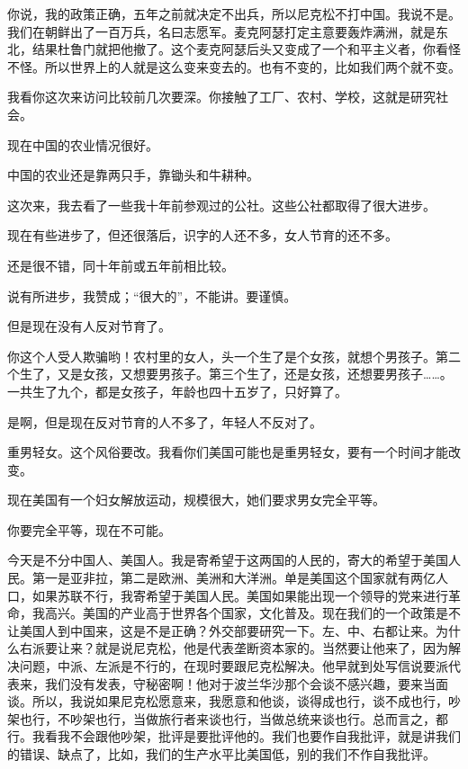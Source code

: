 你说，我的政策正确，五年之前就决定不出兵，所以尼克松不打中国。我说不是。我们在朝鲜出了一百万兵，名曰志愿军。麦克阿瑟打定主意要轰炸满洲，就是东北，结果杜鲁门就把他撤了。这个麦克阿瑟后头又变成了一个和平主义者，你看怪不怪。所以世界上的人就是这么变来变去的。也有不变的，比如我们两个就不变。

我看你这次来访问比较前几次要深。你接触了工厂、农村、学校，这就是研究社会。

现在中国的农业情况很好。

中国的农业还是靠两只手，靠锄头和牛耕种。

这次来，我去看了一些我十年前参观过的公社。这些公社都取得了很大进步。

现在有些进步了，但还很落后，识字的人还不多，女人节育的还不多。

还是很不错，同十年前或五年前相比较。

说有所进步，我赞成；“很大的”，不能讲。要谨慎。

但是现在没有人反对节育了。

你这个人受人欺骗哟！农村里的女人，头一个生了是个女孩，就想个男孩子。第二个生了，又是女孩，又想要男孩子。第三个生了，还是女孩，还想要男孩子……。一共生了九个，都是女孩子，年龄也四十五岁了，只好算了。

是啊，但是现在反对节育的人不多了，年轻人不反对了。

重男轻女。这个风俗要改。我看你们美国可能也是重男轻女，要有一个时间才能改变。

现在美国有一个妇女解放运动，规模很大，她们要求男女完全平等。

你要完全平等，现在不可能。

今天是不分中国人、美国人。我是寄希望于这两国的人民的，寄大的希望于美国人民。第一是亚非拉，第二是欧洲、美洲和大洋洲。单是美国这个国家就有两亿人口，如果苏联不行，我寄希望于美国人民。美国如果能出现一个领导的党来进行革命，我高兴。美国的产业高于世界各个国家，文化普及。现在我们的一个政策是不让美国人到中国来，这是不是正确？外交部要研究一下。左、中、右都让来。为什么右派要让来？就是说尼克松，他是代表垄断资本家的。当然要让他来了，因为解决问题，中派、左派是不行的，在现时要跟尼克松解决。他早就到处写信说要派代表来，我们没有发表，守秘密啊！他对于波兰华沙那个会谈不感兴趣，要来当面谈。所以，我说如果尼克松愿意来，我愿意和他谈，谈得成也行，谈不成也行，吵架也行，不吵架也行，当做旅行者来谈也行，当做总统来谈也行。总而言之，都行。我看我不会跟他吵架，批评是要批评他的。我们也要作自我批评，就是讲我们的错误、缺点了，比如，我们的生产水平比美国低，别的我们不作自我批评。


